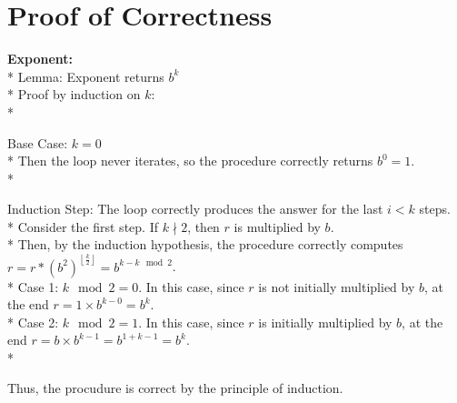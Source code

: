 \documentclass[letterpaper, reqno, 11pt]{article}
\begin{document}
\section*{Proof of Correctness}
\begin{description}
	\item{\bf Exponent:}\\*
	Lemma: Exponent returns $b^k$\\*
	Proof by induction on $k$:\\*
	\begin{description}
		\item{Base Case:} $k=0$\\*
		Then the loop never iterates, so the procedure correctly returns $b^0=1$.\\*
		\item{Induction Step:} The loop correctly produces the answer for the last $i<k$ steps.\\*
		Consider the first step. If $k\nmid 2$, then $r$ is multiplied by $b$.\\*
		Then, by the induction hypothesis, the procedure correctly computes
		$r=r*(b^2)^{\left\lfloor\frac{k}{2}\right\rfloor}=b^{k-k\mod2}$.\\*
		Case 1: $k\mod 2=0$. In this case, since $r$ is not initially multiplied by $b$,
			at the end $r=1\times b^{k-0}=b^k$.\\*
		Case 2:	$k\mod 2=1$. In this case, since $r$ is initially multiplied by $b$,
			at the end $r=b\times b^{k-1}=b^{1+k-1}=b^k$.\\*
	\end{description}
	Thus, the procudure is correct by the principle of induction.


\end{description}
\end{document}
